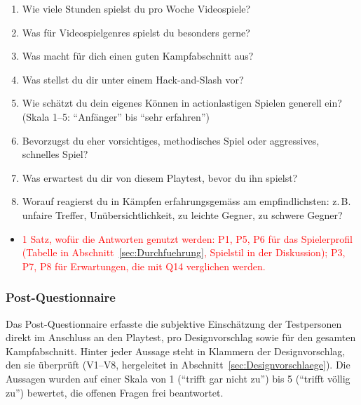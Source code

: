 \documentclass[../Main.tex]{subfiles}
\begin{document}
\begin{enumerate}[label=\textbf{P\arabic*}, leftmargin=1.5cm, itemsep=0.5em]
    \item Wie viele Stunden spielst du pro Woche Videospiele?
    \item Was für Videospielgenres spielst du besonders gerne?
    \item Was macht für dich einen guten Kampfabschnitt aus?
    \item Was stellst du dir unter einem Hack-and-Slash vor?
    \item Wie schätzt du dein eigenes Können in actionlastigen Spielen generell ein? (Skala 1--5: \enquote{Anfänger} bis \enquote{sehr erfahren})
    \item Bevorzugst du eher vorsichtiges, methodisches Spiel oder aggressives, schnelles Spiel?
    \item Was erwartest du dir von diesem Playtest, bevor du ihn spielst?
    \item Worauf reagierst du in Kämpfen erfahrungsgemäss am empfindlichsten: z.\,B. unfaire Treffer, Unübersichtlichkeit, zu leichte Gegner, zu schwere Gegner?
\end{enumerate}

\begin{itemize}[leftmargin=1.5cm]
    \item \textcolor{red}{1 Satz, wofür die Antworten genutzt werden: P1, P5, P6 für das Spielerprofil (Tabelle in Abschnitt~\ref{sec:Durchfuehrung}, Spielstil in der Diskussion); P3, P7, P8 für Erwartungen, die mit Q14 verglichen werden.}
\end{itemize}

\subsubsection{Post-Questionnaire} \label{sec:PostQuestionnaire}

Das Post-Questionnaire erfasste die subjektive Einschätzung der Testpersonen direkt im Anschluss an den Playtest, pro Designvorschlag sowie für den gesamten Kampfabschnitt. Hinter jeder Aussage steht in Klammern der Designvorschlag, den sie überprüft (V1--V8, hergeleitet in Abschnitt~\ref{sec:Designvorschlaege}). Die Aussagen wurden auf einer Skala von 1 (\enquote{trifft gar nicht zu}) bis 5 (\enquote{trifft völlig zu}) bewertet, die offenen Fragen frei beantwortet.
\end{document}
